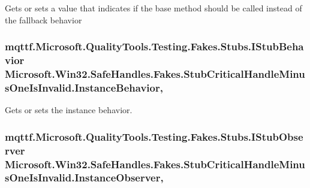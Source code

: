 Gets or sets a value that indicates if the base method should be called instead of the fallback behavior

\hypertarget{class_microsoft_1_1_win32_1_1_safe_handles_1_1_fakes_1_1_stub_critical_handle_minus_one_is_invalid_a22067e948f3c7c8cbe7fc14ef6976c64}{
\subsubsection[{Instance\-Behavior}]{\setlength{\rightskip}{0pt plus 5cm}mqttf.\-Microsoft.\-Quality\-Tools.\-Testing.\-Fakes.\-Stubs.\-I\-Stub\-Behavior Microsoft.\-Win32.\-Safe\-Handles.\-Fakes.\-Stub\-Critical\-Handle\-Minus\-One\-Is\-Invalid.\-Instance\-Behavior\hspace{0.3cm}{\ttfamily [get]}, {\ttfamily [set]}}}\label{class_microsoft_1_1_win32_1_1_safe_handles_1_1_fakes_1_1_stub_critical_handle_minus_one_is_invalid_a22067e948f3c7c8cbe7fc14ef6976c64}


Gets or sets the instance behavior.

\hypertarget{class_microsoft_1_1_win32_1_1_safe_handles_1_1_fakes_1_1_stub_critical_handle_minus_one_is_invalid_ab848b09dee9cd2b0c760deab9d1803ce}{
\subsubsection[{Instance\-Observer}]{\setlength{\rightskip}{0pt plus 5cm}mqttf.\-Microsoft.\-Quality\-Tools.\-Testing.\-Fakes.\-Stubs.\-I\-Stub\-Observer Microsoft.\-Win32.\-Safe\-Handles.\-Fakes.\-Stub\-Critical\-Handle\-Minus\-One\-Is\-Invalid.\-Instance\-Observer\hspace{0.3cm}{\ttfamily [get]}, {\ttfamily [set]}}}\label{class_microsoft_1_1_win32_1_1_safe_handles_1_1_fakes_1_1_stub_critical_handle_minus_one_is_invalid_ab848b09dee9cd2b0c760deab9d1803ce}


